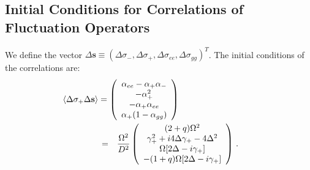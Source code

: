 \documentclass[twocolumn,aps,eqsecnum,showkeys,amsmath]{revtex4-2}
\begin{document}
\subsection{Initial Conditions for Correlations of Fluctuation Operators} 
We define the vector  
$\Delta \mathbf{s} \equiv  \left( \Delta \sigma_-, 
\Delta \sigma_+, \Delta \sigma_{ee}, \Delta \sigma_{gg}  \right)^T$. 
The initial conditions of the correlations are: 
%
\begin{eqnarray} 	 \label{eq:corre2st}
\lefteqn{  \langle \Delta \sigma_+ \Delta \mathbf{s} \rangle = 
\left( \begin{array}{c}  \alpha_{ee} -\alpha_+ \alpha_- \\  -\alpha_+^2 \\ 
-\alpha_+ \alpha_{ee} \\ \alpha_+(1- \alpha_{gg}) \end{array} 	\right)  } 
	\hspace{1.5cm} 	\\
&=& \frac{\Omega^2}{D^2} \left( \begin{array}{c} (2+q) \Omega^2  	\\ 
	\gamma_+^2 +i4\Delta \gamma_+ -4\Delta^2 		\\ 
\Omega [2\Delta -i \gamma_+] 	\\
-(1+q) \Omega [2\Delta -i \gamma_+] 	\end{array} \right) \,. 
	\nonumber \qquad 
\end{eqnarray} 
 
\end{document}
